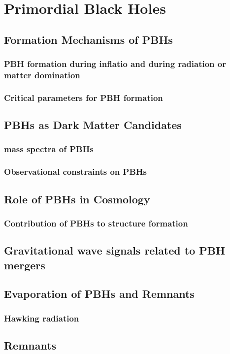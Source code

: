 \chapter{Primordial Black Holes}

\section{Formation Mechanisms of PBHs}
\subsection{PBH formation during inflatio and during radiation or matter domination}
\subsection{Critical parameters for PBH formation}

\section{PBHs as Dark Matter Candidates}
\subsection{mass spectra of PBHs}
\subsection{Observational constraints on PBHs}

\section{Role of PBHs in Cosmology}
\subsection{Contribution of PBHs to structure formation}
\section{Gravitational wave signals related to PBH mergers}

\section{Evaporation of PBHs and Remnants}
\subsection{Hawking radiation}
\section{Remnants}

